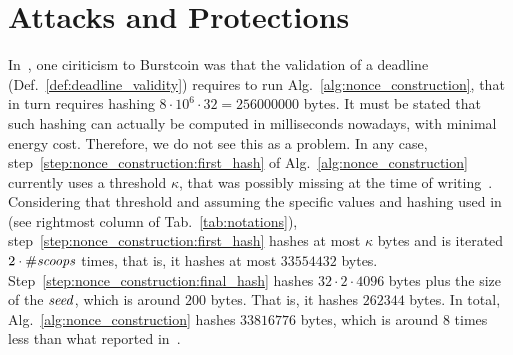 \section{Attacks and Protections}\label{sec:attacks_and_protections}
%
In~\cite{ParkKFGAP18}, one ciriticism to Burstcoin was that
the validation of a deadline
(Def.~\ref{def:deadline_validity}) requires to run
Alg.~\ref{alg:nonce_construction}, that in turn
requires hashing $8\cdot 10^6\cdot 32=256000000$ bytes.
It must be stated that
such hashing can actually be computed in milliseconds nowadays,
with minimal energy cost. Therefore, we do not see this as a problem.
In any case, step~\ref{step:nonce_construction:first_hash} of
Alg.~\ref{alg:nonce_construction} currently uses a threshold $\kappa$,
that was possibly missing at the time of writing~\cite{ParkKFGAP18}.
Considering that threshold and assuming the specific values and hashing
used in~\cite{SignumPlotting} (see rightmost column of Tab.~\ref{tab:notations}),
step~\ref{step:nonce_construction:first_hash}
hashes at most $\kappa$ bytes and is iterated $2\cdot{\#\mathit{scoops}}$ times, that is,
it hashes at most $33554432$ bytes.
Step~\ref{step:nonce_construction:final_hash} hashes $32\cdot 2\cdot 4096$ bytes
plus the size of the ${\mathit{seed}}$, which is around $200$ bytes.
That is, it hashes $262344$ bytes. In total, Alg.~\ref{alg:nonce_construction}
hashes $33816776$ bytes, which is around $8$ times less than what reported
in~\cite{ParkKFGAP18}.
